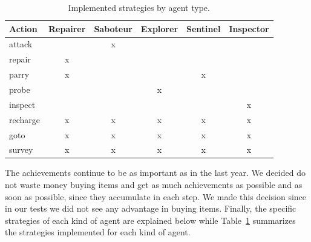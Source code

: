 \begin{table}[th]
\vspace{-5mm}
\begin{center}

	\begin{tabular}{l c c c c c}
		\toprule
		Action & Repairer & Saboteur & Explorer & Sentinel & Inspector \\
		\midrule
		attack &  & x &  &  &  \\
		repair & x &  &  &  &  \\
		parry & x &  &  & x &  \\
		probe &  &  & x &  &  \\
		inspect &  &  &  &  & x \\
		recharge & x & x & x & x & x \\
		goto & x & x & x & x & x \\
		survey & x & x & x & x & x \\
		\bottomrule            
                
	\end{tabular}
\end{center}
\caption{Implemented strategies by agent type. \label{tab:tabStrategies}}
\vspace{-5mm}
\end{table}

The achievements continue to be as important as in the last year. We decided do not waste money buying items and get as much achievements as possible and as soon as possible, since they accumulate in each step. We made this decision since in our tests we did not see any advantage in buying items. Finally, the specific strategies of each kind of agent are explained below while Table~\ref{tab:tabStrategies} summarizes the strategies implemented for each kind of agent.

\vspace{-3mm}

